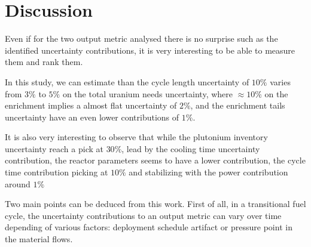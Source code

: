\documentclass{anstrans}
\begin{document}
\section{Discussion}

Even if for the two output metric analysed there is no surprise such as the
identified uncertainty contributions, it is very interesting to be able to
measure them and rank them.

In this study, we can estimate than the cycle length uncertainty of $10\%$
varies from $3\%$ to $5\%$ on the total uranium needs uncertainty, where $\approx10\%$
on the enrichment implies a almost flat uncertainty of $2\%$, and the enrichment
tails uncertainty have an even lower contributions of $1\%$.

It is also very interesting to observe that while the plutonium inventory uncertainty
reach a pick at $30\%$, lead by the cooling time uncertainty contribution, the reactor
parameters seems to have a lower contribution, the cycle time contribution
picking at $10\%$ and stabilizing with the power contribution around $1\%$




Two main points can be deduced from this work. First of all, in a transitional
fuel cycle, the uncertainty contributions to an output metric can vary over time
depending of various factors: deployment schedule artifact or pressure point in
the material flows.

\end{document}
